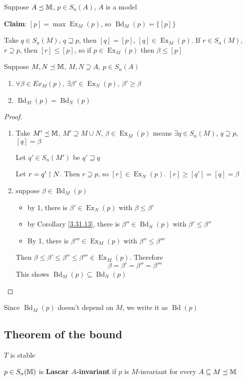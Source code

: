 \documentclass[11pt]{article}
\DeclareMathOperator{\Ex}{Ex}
\DeclareMathOperator{\Bd}{Bd}
\begin{document}
\begin{examplle}[]
Suppose \(A\preceq\mathbb{M}\), \(p\in S_n(A)\), \(A\) is a model

\textbf{Claim}: \([p]=\max\Ex_M(p)\), so \(\Bd_M(p)=\{[p]\}\)

Take \(q\in S_n(M)\), \(q\sqsupseteq p\), then \([q]=[p]\), \([q]\in\Ex_M(p)\).
If \(r\in S_n(M)\), \(r\supseteq p\), then \([r]\le[p]\), so if \(p\in\Ex_M(p)\) then \(\beta\le[p]\)
\end{examplle}

\begin{lemma}[]
Suppose \(M,N\preceq\mathbb{M}\), \(M,N\supseteq A\), \(p\in S_n(A)\)
\begin{enumerate}
\item \(\forall\beta\in Ex_M(p)\), \(\exists\beta'\in\Ex_N(p)\), \(\beta'\ge\beta\)
\item \(\Bd_M(p)=\Bd_N(p)\)
\end{enumerate}
\end{lemma}

\begin{proof}
\begin{enumerate}
\item Take \(M'\preceq\mathbb{M}\), \(M'\supseteq M\cup N\), \(\beta\in\Ex_M(p)\) means \(\exists q\in S_n(M)\), \(q\supseteq p\), \([q]=\beta\)

Let \(q'\in S_n(M')\) be \(q'\sqsupseteq q\)

Let \(r=q'\upharpoonright N\). Then \(r\supseteq p\), so \([r]\in\Ex_N(p)\). \([r]\ge[q']=[q]=\beta\)
\item suppose \(\beta\in\Bd_M(p)\)
\begin{itemize}
\item by 1, there is \(\beta'\in\Ex_N(p)\) with \(\beta\le\beta'\)
\item by Corollary \ref{3.31.13}, there is \(\beta''\in\Bd_N(p)\) with \(\beta'\le\beta''\)
\item By 1, there is \(\beta'''\in\Ex_M(p)\) with \(\beta''\le\beta'''\)
\end{itemize}
Then \(\beta\le\beta'\le\beta''\le\beta'''\in\Ex_M(p)\). Therefore
\begin{equation*}
\beta=\beta'=\beta''=\beta'''
\end{equation*}
This shows \(\Bd_M(p)\subseteq\Bd_N(p)\)
\end{enumerate}
\end{proof}

Since \(\Bd_M(p)\) doesn't depend on \(M\), we write it as \(\Bd(p)\)
\subsection{Theorem of the bound}
\label{sec:org636a116}
\(T\) is stable
\begin{definition}[]
\(p\in S_n(\mathbb{M})\) is \textbf{Lascar \(A\)-invariant} if \(p\) is \(M\)-invariant for every \(A\subseteq M\preceq\mathbb{M}\)
\end{definition}
\end{document}
